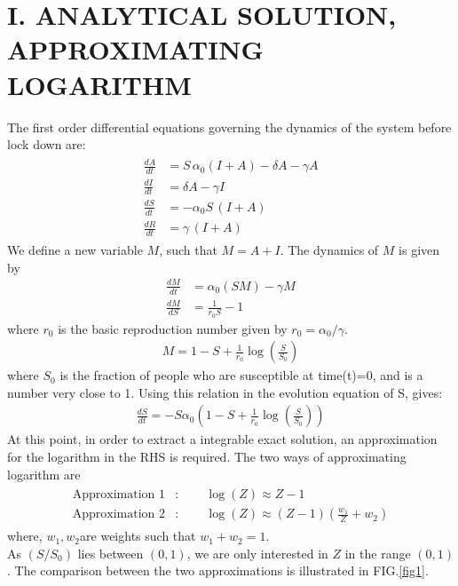 \documentclass[aps,floatfix,prl,superscriptaddress]{revtex4}
\begin{document}
\section{I. ANALYTICAL SOLUTION, APPROXIMATING LOGARITHM}
The first order differential equations governing the dynamics of the system before lock down are:
\begin{align}
\label{Basic}
\begin{split}
\frac{d A}{dt} &= S  \, \alpha_0 \left(  I+   A\right) - \delta  A-\gamma A
\\
\frac{d   I }{dt} &=\delta  A-\gamma I \\
\frac{d S}{dt} &= -\alpha_0S  \, \left(I+A\right)\\
\frac{d R}{dt} &= \gamma \, (I+A) 
\end{split}
\end{align}
We define a new variable $M$, such that $M=A+I$. The dynamics of $M$ is given by
\begin{align}
\label{ApI}
\frac{dM}{dt} &= \alpha_0 \left(S M \right) - \gamma M 
\\
\frac{dM}{dS} &= \frac{1}{r_0 S} -1  
\end{align}
where $r_0$ is the basic reproduction number given by $r_0 = \alpha_0/\gamma$.
\begin{align}
	M = 1 - S + \frac{1}{r_0} \log \left(\frac{S}{S_{0}}\right)
\end{align}
where $S_0$ is the fraction of people who are susceptible at time(t)=0, and is a number very close to 1.
Using this relation in the evolution equation of S, gives:
\begin{align}
\frac{dS}{dt} = - S \alpha_0 \left( 1 - S + \frac{1}{r_0} \log \left(\frac{S}{S_{0}}\right) \right)
\end{align}
At this point, in order to extract a integrable exact solution, an approximation for the logarithm in the RHS is required. The two ways of approximating logarithm are
\begin{align}
\begin{split}
\text{Approximation 1} &: \qquad \log(Z) \approx Z-1
\\
\text{Approximation 2} &: \qquad \log(Z) \approx (Z-1) \left( \frac{w_1}{Z} +  w_2\right)
\end{split}  
\end{align}   
where, $w_1,w_2$are weights such that $w_1 + w_2 = 1$. 
\\
As $(S/S_{0})$ lies between $(0,1)$, we are only interested in $Z$ in the range $(0,1)$. The comparison between the two approximations is illustrated in FIG.\ref{fig1}.
\end{document}
